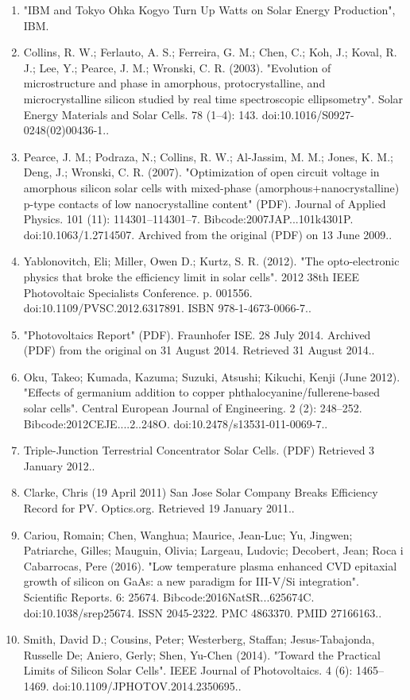 \begin{enumerate}
\item "IBM and Tokyo Ohka Kogyo Turn Up Watts on Solar Energy Production", IBM.
\item Collins, R. W.; Ferlauto, A. S.; Ferreira, G. M.; Chen, C.; Koh, J.; Koval, R. J.; Lee, Y.; Pearce, J. M.; Wronski, C. R. (2003). "Evolution of microstructure and phase in amorphous, protocrystalline, and microcrystalline silicon studied by real time spectroscopic ellipsometry". Solar Energy Materials and Solar Cells. 78 (1–4): 143. doi:10.1016/S0927-0248(02)00436-1..
\item Pearce, J. M.; Podraza, N.; Collins, R. W.; Al-Jassim, M. M.; Jones, K. M.; Deng, J.; Wronski, C. R. (2007). "Optimization of open circuit voltage in amorphous silicon solar cells with mixed-phase (amorphous+nanocrystalline) p-type contacts of low nanocrystalline content" (PDF). Journal of Applied Physics. 101 (11): 114301–114301–7. Bibcode:2007JAP...101k4301P. doi:10.1063/1.2714507. Archived from the original (PDF) on 13 June 2009..
\item Yablonovitch, Eli; Miller, Owen D.; Kurtz, S. R. (2012). "The opto-electronic physics that broke the efficiency limit in solar cells". 2012 38th IEEE Photovoltaic Specialists Conference. p. 001556. doi:10.1109/PVSC.2012.6317891. ISBN 978-1-4673-0066-7..
\item "Photovoltaics Report" (PDF). Fraunhofer ISE. 28 July 2014. Archived (PDF) from the original on 31 August 2014. Retrieved 31 August 2014..
\item Oku, Takeo; Kumada, Kazuma; Suzuki, Atsushi; Kikuchi, Kenji (June 2012). "Effects of germanium addition to copper phthalocyanine/fullerene-based solar cells". Central European Journal of Engineering. 2 (2): 248–252. Bibcode:2012CEJE....2..248O. doi:10.2478/s13531-011-0069-7..
\item Triple-Junction Terrestrial Concentrator Solar Cells. (PDF) Retrieved 3 January 2012..
\item Clarke, Chris (19 April 2011) San Jose Solar Company Breaks Efficiency Record for PV. Optics.org. Retrieved 19 January 2011..
\item Cariou, Romain; Chen, Wanghua; Maurice, Jean-Luc; Yu, Jingwen; Patriarche, Gilles; Mauguin, Olivia; Largeau, Ludovic; Decobert, Jean; Roca i Cabarrocas, Pere (2016). "Low temperature plasma enhanced CVD epitaxial growth of silicon on GaAs: a new paradigm for III-V/Si integration". Scientific Reports. 6: 25674. Bibcode:2016NatSR...625674C. doi:10.1038/srep25674. ISSN 2045-2322. PMC 4863370. PMID 27166163..
\item Smith, David D.; Cousins, Peter; Westerberg, Staffan; Jesus-Tabajonda, Russelle De; Aniero, Gerly; Shen, Yu-Chen (2014). "Toward the Practical Limits of Silicon Solar Cells". IEEE Journal of Photovoltaics. 4 (6): 1465–1469. doi:10.1109/JPHOTOV.2014.2350695..

\end{enumerate}
